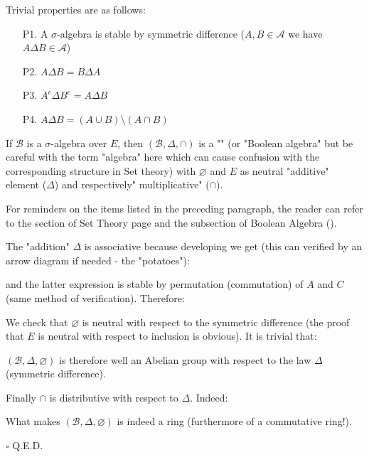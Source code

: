 	Trivial properties are as follows:
	\begin{enumerate}
		\item[P1.] A $\sigma$-algebra is stable by symmetric difference ($A,B\in \mathcal{A}$ we have $A\Delta B\in \mathcal{A}$)
		
		\item[P2.] $A\Delta B=B\Delta A$
		\item[P3.] $A^c\Delta B^c=A\Delta B$
			
		\item[P4.] $A\Delta B=(A\cup B)\setminus (A\cap B)$
	\end{enumerate}
	\begin{theorem}
	If $\mathcal{B}$ is a $\sigma$-algebra over $E$, then $(\mathcal{B},\Delta,\cap)$ is a "" (or "Boolean algebra" but be careful with the term "algebra" here which can cause confusion with the corresponding structure in Set theory) with $\varnothing$ and $E$ as neutral "additive" element ($\Delta$) and respectively" multiplicative" ($\cap$).
	\end{theorem}
	\begin{tcolorbox}[title=Remark,colframe=black,arc=10pt]
	For reminders on the items listed in the preceding paragraph, the reader can refer to the section of Set Theory page \pageref{set theory} and the subsection of Boolean Algebra ().
	\end{tcolorbox}	
	\begin{dem}
	The "addition" $\Delta$ is associative because developing we get (this can verified by an arrow diagram if needed - the "potatoes"):
	
	and the latter expression is stable by permutation (commutation) of $A$ and $C$ (same method of verification). Therefore:
	
	We check that $\varnothing$ is neutral with respect to the symmetric difference (the proof that $E$ is neutral with respect to inclusion is obvious). It is trivial that:
	
	$(\mathcal{B},\Delta,\varnothing)$ is therefore well an Abelian group with respect to the law $\Delta$ (symmetric difference).
	
	Finally $\cap$ is distributive with respect to $\Delta$. Indeed:
	
	What makes $(\mathcal{B},\Delta,\varnothing)$ is indeed a ring (furthermore of a commutative ring!).
	\begin{flushright}
		$\square$  Q.E.D.
	\end{flushright}
	\end{dem}

